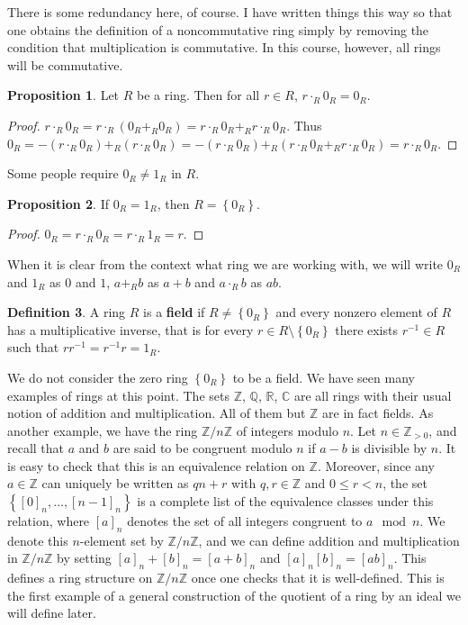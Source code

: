 \documentclass{article}
\newcommand{\Z}{\mathbb{Z}}
\newcommand{\Q}{\mathbb{Q}}
\newcommand{\R}{\mathbb{R}}
\newcommand{\C}{\mathbb{C}}
\newcommand{\rb}[1]{\left( #1 \right)}
\renewcommand{\sb}[1]{\left[ #1 \right]}
\newcommand{\cb}[1]{\left\{ #1 \right\}}
\theoremstyle{definition}\newtheorem{definition}{Definition}[subsection]
\theoremstyle{definition}\newtheorem{remark}[definition]{Remark}
\theoremstyle{definition}\newtheorem*{example}{Example}
\theoremstyle{definition}\newtheorem*{note}{Note}
\newtheorem{proposition}[definition]{Proposition}
\begin{document}
There is some redundancy here, of course. I have written things this way so that one obtains the definition of a noncommutative ring simply by removing the condition that multiplication is commutative. In this course, however, all rings will be commutative.

\begin{proposition}
Let $ R $ be a ring. Then for all $ r \in R $, $ r \cdot_R 0_R = 0_R $.
\end{proposition}

\begin{proof}
$ r \cdot_R 0_R = r \cdot_R \rb{0_R +_R 0_R} = r \cdot_R 0_R +_R r \cdot_R 0_R $. Thus $ 0_R = -\rb{r \cdot_R 0_R} +_R \rb{r \cdot_R 0_R} = -\rb{r \cdot_R 0_R} +_R \rb{r \cdot_R 0_R +_R r \cdot_R 0_R} = r \cdot_R 0_R $.
\end{proof}

Some people require $ 0_R \ne 1_R $ in $ R $.

\begin{proposition}
If $ 0_R = 1_R $, then $ R = \cb{0_R} $.
\end{proposition}

\begin{proof}
$ 0_R = r \cdot_R 0_R = r \cdot_R 1_R = r $.
\end{proof}

When it is clear from the context what ring we are working with, we will write $ 0_R $ and $ 1_R $ as $ 0 $ and $ 1 $, $ a +_R b $ as $ a + b $ and $ a \cdot_R b $ as $ ab $.

\begin{definition}
A ring $ R $ is a \textbf{field} if $ R \ne \cb{0_R} $ and every nonzero element of $ R $ has a multiplicative inverse, that is for every $ r \in R \setminus \cb{0_R} $ there exists $ r^{-1} \in R $ such that $ rr^{-1} = r^{-1}r = 1_R $.
\end{definition}

We do not consider the zero ring $ \cb{0_R} $ to be a field. We have seen many examples of rings at this point. The sets $ \Z $, $ \Q $, $ \R $, $ \C $ are all rings with their usual notion of addition and multiplication. All of them but $ \Z $ are in fact fields. As another example, we have the ring $ \Z / n\Z $ of integers modulo $ n $. Let $ n \in \Z_{> 0} $, and recall that $ a $ and $ b $ are said to be congruent modulo $ n $ if $ a - b $ is divisible by $ n $. It is easy to check that this is an equivalence relation on $ \Z $. Moreover, since any $ a \in \Z $ can uniquely be written as $ qn + r $ with $ q, r \in \Z $ and $ 0 \le r < n $, the set $ \cb{\sb{0}_n, \dots, \sb{n - 1}_n} $ is a complete list of the equivalence classes under this relation, where $ \sb{a}_n $ denotes the set of all integers congruent to $ a \mod n $. We denote this $ n $-element set by $ \Z / n\Z $, and we can define addition and multiplication in $ \Z / n\Z $ by setting $ \sb{a}_n + \sb{b}_n = \sb{a + b}_n $ and $ \sb{a}_n\sb{b}_n = \sb{ab}_n $. This defines a ring structure on $ \Z / n\Z $ once one checks that it is well-defined. This is the first example of a general construction of the quotient of a ring by an ideal we will define later.
\end{document}
